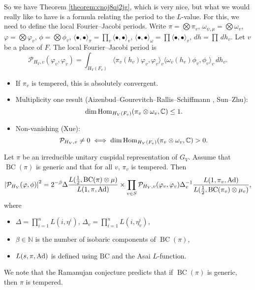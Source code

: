 \documentclass[reqno]{amsart} 
\begin{document}
So we have Theorem \ref{theorem:cnoj8qj2jg}, which is very nice, but what we would really like to  have is a formula relating the period to the $L$-value.  For this, we need to define the local Fourier--Jacobi periods.  Write $\pi = \bigotimes \pi_v$, $\omega_{\psi, \mu} = \bigotimes \omega_v$, $\varphi = \bigotimes \varphi_v$, $\phi = \bigotimes \phi_v$, $\langle \bullet, \bullet \rangle_\pi = \prod_v \langle \bullet, \bullet \rangle_v$, $\langle \bullet, \bullet \rangle_\omega = \prod \langle \bullet, \bullet \rangle_v$, $d h = \prod \, d h_v$.  Let $v$ be a place of $F$.  The local Fourier--Jacobi period is
\begin{equation*}
  \mathcal{P}_{H_V, v}(\varphi_v, \varphi_v) = \int_{H_V(F_v)} \langle \pi_v(h_v) \varphi_v, \varphi_v \rangle_v \langle \omega_v(h_v) \phi_v, \phi_v \rangle_v \, d h_v.
\end{equation*}
\begin{itemize}
\item If $\pi_v$ is tempered, this is absolutely convergent.
\item Multiplicity one result (Aizenbud--Gourevitch--Rallis--Schiffmann , Sun--Zhu):
  \begin{equation*}
    \dim \operatorname{Hom}_{H_V(F_v)}(\pi_v \otimes \omega_v, \mathbb{C}) \leq 1.
  \end{equation*}
\item Non-vanishing (Xue):
  \begin{equation*}
    \mathcal{P}_{H_V, v} \neq 0 \iff \dim \operatorname{Hom}_{H_V(F_v)}(\pi_v \otimes \omega_v, \mathbb{C}) > 0.
  \end{equation*}
\end{itemize}
\begin{theorem}[B., Lu, Xue, 2024]
  Let $\pi$ be an irreducible unitary cuspidal representation of $G_{V}$.  Assume that $\operatorname{BC}(\pi)$ is generic and that for all $v$, $\pi_v$ is tempered.  Then
  \begin{equation*}
    \left| \mathcal{P}_{H_V}(\varphi, \phi) \right|^2 = 2^{- \beta} \Delta
    \frac{L(\tfrac{1}{2}, \operatorname{BC}(\pi) \otimes \mu)}{L(1, \pi, \operatorname{Ad})}
    \times \prod_{v \in S} \mathcal{P}_{H_V, v}
    (\varphi_v, \varphi_v) \Delta_v^{-1}
    \frac{L(1, \pi_v, \operatorname{Ad})}{L(\tfrac{1}{2}, \operatorname{BC}(\pi_v) \otimes \mu_v )},
  \end{equation*}
  where
  \begin{itemize}
  \item $\Delta = \prod_{i = 1}^n L(i, \eta^i)$, $\Delta_v = \prod_{i = 1}^n L(i, \eta_v^i)$,
  \item $\beta \in \mathbb{N}$ is the number of isobaric components of $\operatorname{BC}(\pi)$,
  \item $L(s, \pi, \operatorname{Ad})$ is defined using $\mathrm{BC}$ and the Asai $L$-function.
  \end{itemize}
\end{theorem}
We note that the Ramanujan conjecture predicts that if $\operatorname{BC}(\pi)$ is generic, then $\pi$ is tempered.
\end{document}
